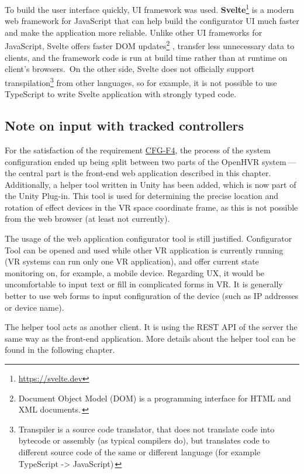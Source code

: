 To build the user interface quickly, UI framework was used.
\textbf{Svelte}\footnote{\href{https://svelte.dev}{https://svelte.dev}} is a modern web framework for JavaScript
that can help build the configurator UI much faster and make the application
more reliable. Unlike other UI frameworks for JavaScript, Svelte offers
faster DOM updates\footnote{Document Object Model (DOM) is a programming interface for HTML and XML documents.\,\cite{dom}}
, transfer less unnecessary data to clients, and the framework code is run 
at build time rather than at runtime on client’s browsers.\,\cite{svelteblog} 
On the other side, Svelte does not officially
support transpilation\footnote{Transpiler is a source code translator, that does 
not translate code into bytecode or assembly (as typical compilers do), but 
translates code to different source code of the same or different language 
(for example TypeScript -> JavaScript)\,\cite{sscd}}
from other languages, so for example, it is not possible
to use TypeScript to write Svelte application with strongly typed code.


\subsection{Note on input with tracked controllers}
For the satisfaction of the requirement \hyperref[cfg-f4]{CFG-F4}, the process of the system configuration
ended up being split between two parts of the OpenHVR system — the central part is the front-end web application described
in this chapter. Additionally, a helper tool written in Unity has been added,
which is now part of the Unity Plug-in. This tool is used for determining
the precise location and rotation of effect devices in the VR space
coordinate frame, as this is not possible from the web browser (at least
not currently).


The usage of the web application configurator tool is still justified.
Configurator Tool can be opened and used while other VR application is currently
running (VR systems can run only one VR application), and offer current state
monitoring on, for example, a mobile device. Regarding UX, it would be uncomfortable to
input text or fill in complicated forms in VR. It is generally better to use web forms to
input configuration of the device (such as IP addresses or device name).


The helper tool acts as another client. It is using the REST API of the server
the same way as the front-end application. More details about the helper tool
can be found in the following chapter.


